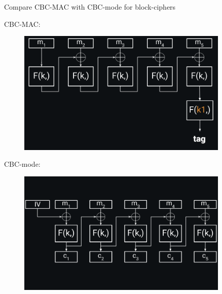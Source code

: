 \documentclass[usenames,dvipsnames, 9pt]{beamer}
\begin{document}
\begin{frame}{Compare CBC-MAC with CBC-mode for block-ciphers}
\vspace{10pt}
\begin{minipage}{0.18\textwidth} \Large CBC-MAC: \end{minipage}
\begin{minipage}{0.80\textwidth}
\begin{figure}
	\includegraphics[width=0.9\textwidth]{CBC_MAC} 
\end{figure}
\end{minipage}
\vspace{-10pt}
\begin{minipage}{0.18\textwidth} \Large CBC-mode: \end{minipage}
\begin{minipage}{0.80\textwidth}
	\begin{figure}
		\includegraphics[width=0.9\textwidth]{CBC_1} 
	\end{figure}
\end{minipage}

\end{frame}
\end{document}
